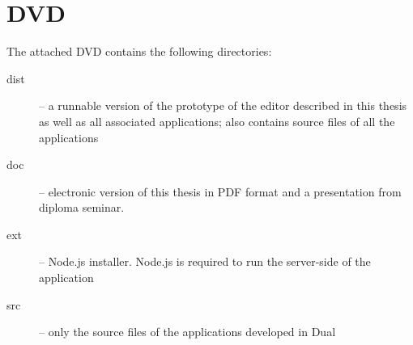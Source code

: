\chapter{DVD}\label{app:dvd}

\begin{figure}[htb]
\makebox[\textwidth]{\framebox[12.8cm]{\rule{0pt}{12.8cm}}}
\end{figure}
\pagebreak

The attached DVD contains the following directories:
\begin{description}
\item[dist] -- a runnable version of the prototype of the editor described in this thesis as well as all associated applications; also contains source files of all the applications
\item[doc] -- electronic version of this thesis in PDF format and a presentation from
diploma seminar.
\item[ext] -- Node.js installer. Node.js is required to run the server-side of the application
\item[src] -- only the source files of the applications developed in Dual
\end{description}

